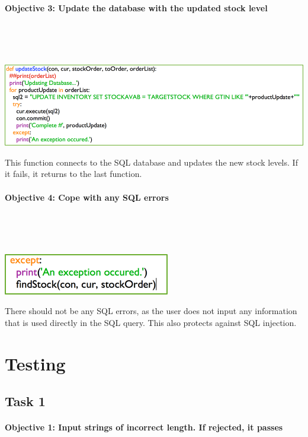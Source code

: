 \documentclass[a4paper]{article}
\begin{document}
\paragraph{Objective 3: Update the database with the updated stock level} ~\par ~\par
\noindent\includegraphics{task3_obj3_1.png} \par 
This function connects to the SQL database and updates the new stock levels. If it fails, it returns to the last function. 
\paragraph{Objective 4: Cope with any SQL errors} ~\par ~\par
\noindent\includegraphics{task3_obj4_1.png} \par 
There should not be any SQL errors, as the user does not input any information that is used directly in the SQL query. This also protects against SQL injection.

\newpage

\section{Testing}
\subsection{Task 1}
\paragraph{Objective 1: Input strings of incorrect length. If rejected, it passes}
\end{document}
